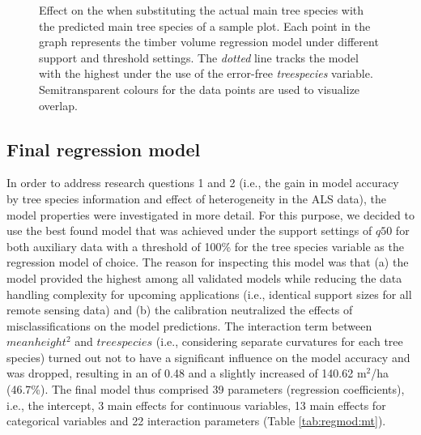 \begin{figure}[h]
	\centering
	\caption{Effect on the \adjrsq{} when substituting the actual main tree species with the predicted  main tree species of a sample plot. Each point in the graph represents the timber volume regression model under different support and threshold settings. The \textit{dotted} line tracks the model with the highest \adjrsq{} under the use of the error-free \textit{treespecies} variable. Semitransparent colours for the data points are used to visualize overlap.}
	\label{fig:supp_r2_calnocal}
\end{figure}


\subsection{Final regression model}
\label{sec:regmod_final}

In order to address research questions 1 and 2 (i.e., the gain in model accuracy by tree species information and effect of heterogeneity in the ALS data), the model properties were investigated in more detail. For this purpose, we decided to use the best found model that was achieved under the support settings of $q50$ for both auxiliary data with a threshold of 100\% for the tree species variable as the regression model of choice. The reason for inspecting this model was that (a) the model provided the highest \adjrsq{} among all validated models while reducing the data handling complexity for upcoming applications (i.e., identical support sizes for all remote sensing data) and (b) the calibration neutralized the effects of misclassifications on the model predictions. The interaction term between $meanheight^2$ and $treespecies$ (i.e., considering separate curvatures for each tree species) turned out not to have a significant influence on the model accuracy and was dropped, resulting in an \adjrsq{} of 0.48 and a slightly increased \rmsecv{} of 140.62 m$^2$/ha (46.7\%). The final model thus comprised 39 parameters (regression coefficients), i.e., the intercept, 3 main effects for continuous variables, 13 main effects for categorical variables and 22 interaction parameters (Table \ref{tab:regmod:mt}).\par

